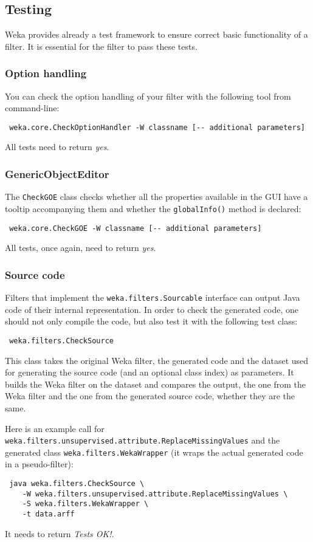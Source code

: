 \newpage
\subsection{Testing}
Weka provides already a test framework to ensure correct basic functionality of
a filter. It is essential for the filter to pass these tests.

\subsubsection{Option handling}
You can check the option handling of your filter with the following tool from
command-line:
\begin{verbatim}
 weka.core.CheckOptionHandler -W classname [-- additional parameters]
\end{verbatim}
All tests need to return \textit{yes}.

\subsubsection{GenericObjectEditor}
The \texttt{CheckGOE} class checks whether all the properties available in the
GUI have a tooltip accompanying them and whether the \texttt{globalInfo()}
method is declared:
\begin{verbatim}
 weka.core.CheckGOE -W classname [-- additional parameters]
\end{verbatim}
All tests, once again, need to return \textit{yes}.

\subsubsection{Source code}
Filters that implement the \texttt{weka.filters.Sourcable} interface can output
Java code of their internal representation. In order to check the generated
code, one should not only compile the code, but also test it with the following
test class:
\begin{verbatim}
 weka.filters.CheckSource
\end{verbatim}
This class takes the original Weka filter, the generated code and the dataset
used for generating the source code (and an optional class index) as parameters.
It builds the Weka filter on the dataset and compares the output, the one from
the Weka filter and the one from the generated source code, whether they are the
same.

Here is an example call for
\texttt{weka.filters.unsupervised.attribute.ReplaceMissingValues} and the
generated class \texttt{weka.filters.WekaWrapper} (it wraps the actual generated
code in a pseudo-filter):
\begin{verbatim}
 java weka.filters.CheckSource \
    -W weka.filters.unsupervised.attribute.ReplaceMissingValues \
    -S weka.filters.WekaWrapper \
    -t data.arff
\end{verbatim}
It needs to return \textit{Tests OK!}.

